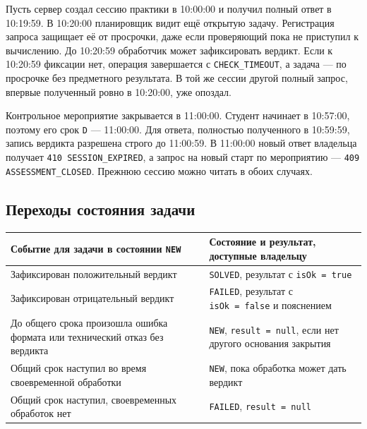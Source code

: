 \documentclass[12pt,a4paper]{article}
\begin{document}
\hypertarget{согласование-параллельных-событий}{}

Пусть сервер создал сессию практики в 10:00:00 и получил полный ответ в 10:19:59. В 10:20:00 планировщик видит ещё открытую задачу. Регистрация запроса защищает её от просрочки, даже если проверяющий пока не приступил к вычислению. До 10:20:59 обработчик может зафиксировать вердикт. Если к 10:20:59 фиксации нет, операция завершается с \texttt{CHECK\_\allowbreak{}TIMEOUT}, а задача --- по просрочке без предметного результата. В той же сессии другой полный запрос, впервые полученный ровно в 10:20:00, уже опоздал.

Контрольное мероприятие закрывается в 11:00:00. Студент начинает в 10:57:00, поэтому его срок \texttt{D} --- 11:00:00. Для ответа, полностью полученного в 10:59:59, запись вердикта разрешена строго до 11:00:59. В 11:00:00 новый ответ владельца получает \texttt{410 SESSION\_\allowbreak{}EXPIRED}, а запрос на новый старт по мероприятию --- \texttt{409 ASSESSMENT\_\allowbreak{}CLOSED}. Прежнюю сессию можно читать в обоих случаях.

\subsection{Переходы состояния задачи}\label{ux43fux435ux440ux435ux445ux43eux434ux44b-ux441ux43eux441ux442ux43eux44fux43dux438ux44f-ux437ux430ux434ux430ux447ux438}

\hypertarget{переходы-состояния-задачи}{}

{\def\LTcaptype{none} %
\begin{longtable}[]{@{}
  >{\raggedright\arraybackslash}p{}
  >{\raggedright\arraybackslash}p{}@{}}
\toprule\noalign{}
\begin{minipage}[b]{\linewidth}\raggedright
Событие для задачи в состоянии \texttt{NEW}
\end{minipage} & \begin{minipage}[b]{\linewidth}\raggedright
Состояние и результат, доступные владельцу
\end{minipage} \\
\midrule\noalign{}
\endhead
\bottomrule\noalign{}
\endlastfoot
Зафиксирован положительный вердикт & \texttt{SOLVED}, результат с \texttt{isOk\ =\ true} \\
Зафиксирован отрицательный вердикт & \texttt{FAILED}, результат с \texttt{isOk\ =\ false} и пояснением \\
До общего срока произошла ошибка формата или технический отказ без вердикта & \texttt{NEW}, \texttt{result\ =\ null}, если нет другого основания закрытия \\
Общий срок наступил во время своевременной обработки & \texttt{NEW}, пока обработка может дать вердикт \\
Общий срок наступил, своевременных обработок нет & \texttt{FAILED}, \texttt{result\ =\ null} \\
\end{longtable}
}
\end{document}
